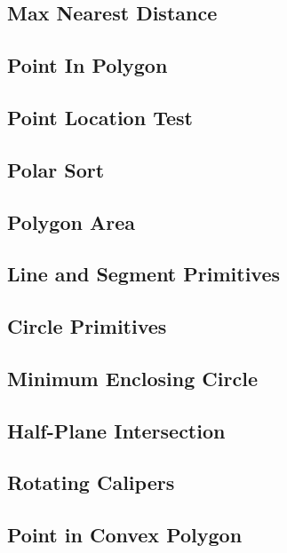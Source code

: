 \documentclass[10pt,letterpaper,landscape,twocolumn]{article}
\begin{document}
\subsection{Max Nearest Distance}

\subsection{Point In Polygon}

\subsection{Point Location Test}

\subsection{Polar Sort}

\subsection{Polygon Area}

\subsection{Line and Segment Primitives}

\subsection{Circle Primitives}

\subsection{Minimum Enclosing Circle}

\subsection{Half-Plane Intersection}

\subsection{Rotating Calipers}

\subsection{Point in Convex Polygon}

\end{document}
